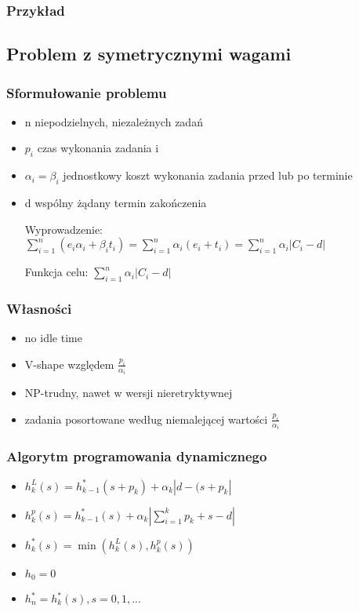 \documentclass[12pt,a4paper]{article}
\begin{document}
\subsubsection{Przykład}
\subsection{Problem z symetrycznymi wagami}
\subsubsection{Sformułowanie problemu}
\begin{itemize}
\item n niepodzielnych, niezależnych zadań
\item $p_{i}$ czas wykonania zadania i
\item $\alpha_{i} =\beta_{i}$ jednostkowy koszt wykonania zadania przed lub po terminie
\item d wspólny żądany termin zakończenia

Wyprowadzenie: $\sum\limits_{i=1}^{n}(e_{i}\alpha_{i}+\beta_{i}t_{i}) = \sum\limits_{i=1}^{n}\alpha_{i}(e_{i}+t_{i}) = \sum\limits_{i=1}^{n}\alpha_{i}\left | C_{i} - d \right |$

Funkcja celu: $\sum\limits_{i=1}^{n}\alpha_{i}\left | C_{i} - d \right |$
\end{itemize}
\subsubsection{Własności}
\begin{itemize}
\item no idle time
\item V-shape względem $\frac{p_{i}}{\alpha_{i}}$
\item NP-trudny, nawet w wersji nieretryktywnej
\item zadania posortowane według niemalejącej wartości $\frac{p_{i}}{\alpha_{i}}$
\end{itemize}
\subsubsection{Algorytm programowania dynamicznego}
\begin{itemize}
\item $h_{k}^{L}(s) = h_{k-1}^{*}(s+p_{k}) + \alpha_{k} \left | d-(s+p_{k} \right |$
\item $h_{k}^{p}(s) = h_{k-1}^{*}(s) + \alpha_{k} \left | \sum\limits_{i=1}^{k} p_{k}+s-d \right |$
\item $h_{k}^{*}(s)=\min(h_{k}^{L}(s), h_{k}^{p}(s))$
\item $h_{0}=0$
\item $h_{n}^{*} = {h_{k}^{*}(s), s=0,1,...}$
\end{itemize}
\end{document}
